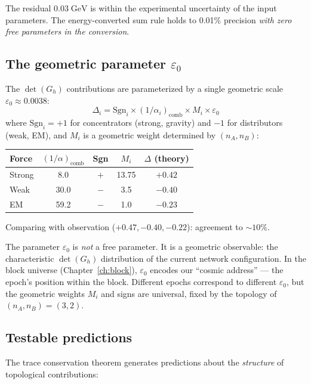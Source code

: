 \documentclass[12pt]{article}
\theoremstyle{remark}
\theoremstyle{definition}
\begin{document}
The residual $0.03\;\text{GeV}$ is within the experimental uncertainty of the input parameters. The energy-converted sum rule holds to 0.01\% precision \emph{with zero free parameters in the conversion}.

\subsection{The geometric parameter $\varepsilon_0$}

The $\det(G_h)$ contributions are parameterized by a single geometric scale $\varepsilon_0 \approx 0.0038$:
\begin{equation}
\Delta_i = \text{Sgn}_i \times (1/\alpha_i)_\text{comb} \times M_i \times \varepsilon_0
\end{equation}
where $\text{Sgn}_i = +1$ for concentrators (strong, gravity) and $-1$ for distributors (weak, EM), and $M_i$ is a geometric weight determined by $(n_A, n_B)$:

\begin{center}
\begin{tabular}{lcccc}
\hline
Force & $(1/\alpha)_\text{comb}$ & Sgn & $M_i$ & $\Delta$ (theory) \\
\hline
Strong & 8.0 & $+$ & 13.75 & $+0.42$ \\
Weak & 30.0 & $-$ & 3.5 & $-0.40$ \\
EM & 59.2 & $-$ & 1.0 & $-0.23$ \\
\hline
\end{tabular}
\end{center}

Comparing with observation ($+0.47, -0.40, -0.22$): agreement to $\sim 10\%$.

The parameter $\varepsilon_0$ is \emph{not} a free parameter. It is a geometric observable: the characteristic $\det(G_h)$ distribution of the current network configuration. In the block universe (Chapter~\ref{ch:block}), $\varepsilon_0$ encodes our ``cosmic address'' --- the epoch's position within the block. Different epochs correspond to different $\varepsilon_0$, but the geometric weights $M_i$ and signs are universal, fixed by the topology of $(n_A, n_B) = (3, 2)$.

\subsection{Testable predictions}

The trace conservation theorem generates predictions about the \emph{structure} of topological contributions:
\end{document}
